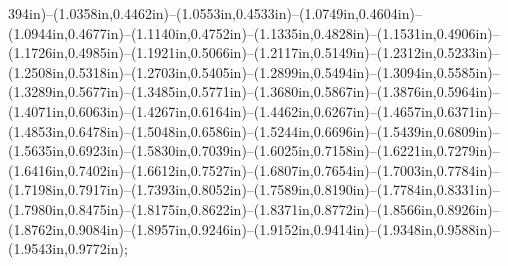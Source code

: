 394in)--(1.0358in,0.4462in)--(1.0553in,0.4533in)--(1.0749in,0.4604in)--(1.0944in,0.4677in)--(1.1140in,0.4752in)--(1.1335in,0.4828in)--(1.1531in,0.4906in)--(1.1726in,0.4985in)--(1.1921in,0.5066in)--(1.2117in,0.5149in)--(1.2312in,0.5233in)--(1.2508in,0.5318in)--(1.2703in,0.5405in)--(1.2899in,0.5494in)--(1.3094in,0.5585in)--(1.3289in,0.5677in)--(1.3485in,0.5771in)--(1.3680in,0.5867in)--(1.3876in,0.5964in)--(1.4071in,0.6063in)--(1.4267in,0.6164in)--(1.4462in,0.6267in)--(1.4657in,0.6371in)--(1.4853in,0.6478in)--(1.5048in,0.6586in)--(1.5244in,0.6696in)--(1.5439in,0.6809in)--(1.5635in,0.6923in)--(1.5830in,0.7039in)--(1.6025in,0.7158in)--(1.6221in,0.7279in)--(1.6416in,0.7402in)--(1.6612in,0.7527in)--(1.6807in,0.7654in)--(1.7003in,0.7784in)--(1.7198in,0.7917in)--(1.7393in,0.8052in)--(1.7589in,0.8190in)--(1.7784in,0.8331in)--(1.7980in,0.8475in)--(1.8175in,0.8622in)--(1.8371in,0.8772in)--(1.8566in,0.8926in)--(1.8762in,0.9084in)--(1.8957in,0.9246in)--(1.9152in,0.9414in)--(1.9348in,0.9588in)--(1.9543in,0.9772in);
